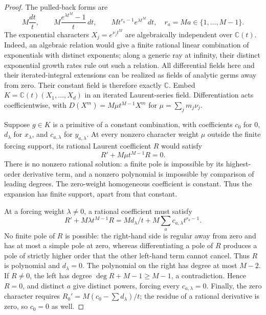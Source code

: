 \documentclass[11pt,a4paper]{article}
\theoremstyle{definition}
\theoremstyle{remark}
\numberwithin{equation}{section}
\begin{document}
\begin{proof}
The pulled-back forms are
\[
 M\frac{dt}{t},\qquad
 M\frac{e^{\lambda t^M}-1}{t}\,dt,\qquad
 M t^{r_a-1}e^{\lambda t^M}\,dt,
 \quad r_a=Ma\in\{1,\ldots,M-1\}.
\]
The exponential characters $X_j=e^{\nu_jt^M}$ are algebraically
independent over $\mathbb C(t)$. Indeed, an algebraic relation would
give a finite rational linear combination of exponentials with distinct
exponents; along a generic ray at infinity, their distinct exponential
growth rates rule out such a relation.
All differential fields here and their iterated-integral extensions can
be realized as fields of analytic germs away from zero. Their constant
field is therefore exactly $\mathbb C$.
Embed $K=\mathbb C(t)(X_1,\ldots,X_d)$ in an iterated Laurent-series
field. Differentiation acts coefficientwise, with
$D(X^m)=M\mu t^{M-1}X^m$ for $\mu=\sum_jm_j\nu_j$.

Suppose $g\in K$ is a primitive of a constant combination, with
coefficients $c_0$ for $0$, $d_\lambda$ for $x_\lambda$, and
$c_{a,\lambda}$ for $y_{a,\lambda}$. At every nonzero character
weight $\mu$ outside the finite forcing support, its rational Laurent
coefficient $R$ would satisfy
\[
 R'+M\mu t^{M-1}R=0.
\]
There is no nonzero rational solution: a finite pole is impossible
by its highest-order derivative term, and a nonzero polynomial is
impossible by comparison of leading degrees. The zero-weight
homogeneous coefficient is constant. Thus the expansion has finite
support, apart from that constant.

At a forcing weight $\lambda\ne0$, a rational coefficient must satisfy
\begin{equation}
 R'+M\lambda t^{M-1}R
 =M d_\lambda/t+M\sum_a c_{a,\lambda}t^{r_a-1}.
 \label{core:eq:rationalode}
\end{equation}
No finite pole of $R$ is possible: the right-hand side is regular away
from zero and has at most a simple pole at zero, whereas differentiating
a pole of $R$ produces a pole of strictly higher order that the other
left-hand term cannot cancel. Thus $R$ is polynomial and $d_\lambda=0$.
The polynomial on the right has degree at most $M-2$. If $R\ne0$,
the left has degree $\deg R+M-1\ge M-1$, a contradiction.
Hence $R=0$, and distinct $a$ give distinct powers, forcing every
$c_{a,\lambda}=0$. Finally, the zero character requires
$R_0'=M(c_0-\sum d_\lambda)/t$; the residue of a rational derivative
is zero, so $c_0=0$ as well.
\end{proof}
\end{document}
